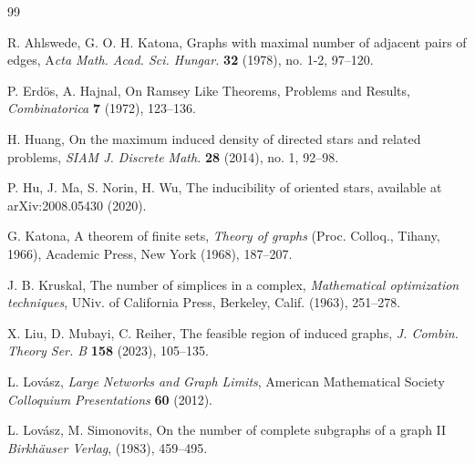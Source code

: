 \documentclass[11pt]{article}
\theoremstyle{definition}
\begin{document}
\begin{thebibliography}{99}

 R. Ahlswede, G. O. H. Katona, Graphs with maximal number of adjacent pairs of edges, A{\em cta Math. Acad. Sci. Hungar.} \textbf{32} (1978), no. 1-2, 97--120.



 P. Erd\"{o}s, A. Hajnal, On Ramsey Like Theorems, Problems and Results, {\em Combinatorica} \textbf{7} (1972), 123--136.



 H. Huang, On the maximum induced density of directed stars and related problems, {\em SIAM J. Discrete Math.} \textbf{28} (2014), no. 1, 92--98.

 P. Hu, J. Ma, S. Norin, H. Wu, The inducibility of oriented stars, available at arXiv:2008.05430 (2020).

 G. Katona, A theorem of finite sets, {\em Theory of graphs} (Proc. Colloq., Tihany, 1966), Academic Press, New York (1968), 187--207.

 J. B. Kruskal, The number of simplices in a complex, {\em Mathematical optimization techniques}, UNiv. of California Press, Berkeley, Calif. (1963), 251--278.

 X. Liu, D. Mubayi, C. Reiher, The feasible region of induced graphs, {\em J. Combin. Theory Ser. B} \textbf{158} (2023), 105--135.

 L. Lov\'{a}sz, {\em Large Networks and Graph Limits}, American Mathematical Society {\em Colloquium Presentations } \textbf{60} (2012).

 L. Lov\'{a}sz, M. Simonovits, On the number of complete subgraphs of a graph II {\em Birkhäuser Verlag}, (1983), 459--495.


\end{thebibliography}
\end{document}
